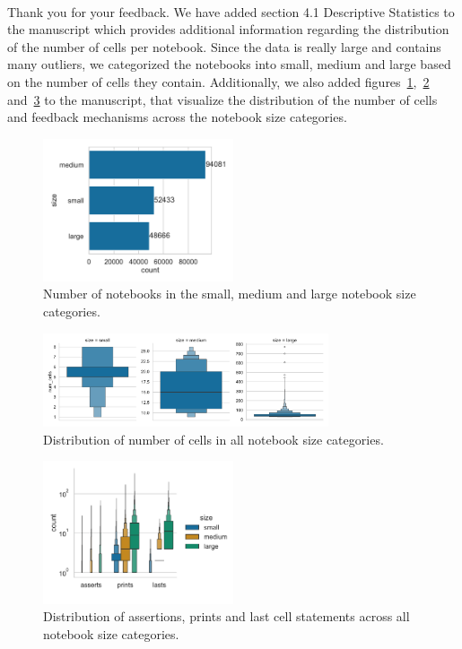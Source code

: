 \documentclass[11pt,fleqn]{article}
\newcommand{\eline}{\vspace*{.75\baselineskip}}
\newcommand{\Us}{\eline \noindent {\bf Response:}\\}
\begin{document}
\Us Thank you for your feedback. We have added section 4.1 Descriptive Statistics to the manuscript which provides additional information regarding the distribution of the number of cells per notebook. Since the data is really large and contains many outliers, we categorized the notebooks into small, medium and large based on the number of cells they contain. Additionally, we also added figures~\ref{fig:notebook-size-distribution},~\ref{fig:cell-per-notebook-size-distribution} and~\ref{fig:fms-per-notebook-size-distribution} to the manuscript, that visualize the distribution of the number of cells and feedback mechanisms across the notebook size categories.

\begin{figure}
  \centering
  \includegraphics[width=0.5\textwidth]{notebook-size-distribution.pdf}
  \caption{Number of notebooks in the small, medium and large notebook size categories.}
  \label{fig:notebook-size-distribution}
\end{figure}

\begin{figure}
  \centering
  \includegraphics[width=0.75\textwidth]{cell-per-notebook-size-distribution.pdf}
  \caption{Distribution of number of cells in all notebook size categories.}
  \label{fig:cell-per-notebook-size-distribution}
\end{figure}

\begin{figure}
  \centering
  \includegraphics[width=0.5\textwidth]{fms-per-notebook-size-distribution.pdf}
  \caption{Distribution of assertions, prints and last cell statements across all notebook size categories.}
  \label{fig:fms-per-notebook-size-distribution}
\end{figure}
\end{document}
